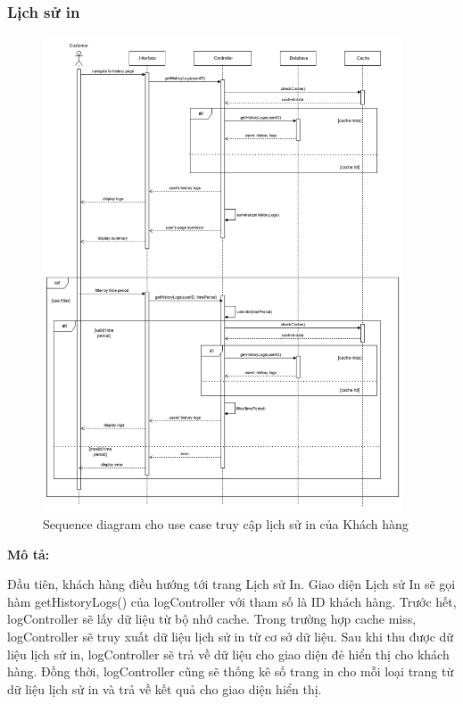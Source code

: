 \subsubsection{Lịch sử in}

\begin{figure}[H]
    \begin{center}
        \includegraphics[width=0.95\textwidth]{Images/System Modelling/Logging(customer)_Sequence.png}
        \caption{Sequence diagram cho use case truy cập lịch sử in của Khách hàng}
        \label{fig:arch}
    \end{center}
\end{figure}

\textbf{Mô tả:}\par

Đầu tiên, khách hàng điều hướng tới trang Lịch sử In. Giao diện Lịch sử In sẽ gọi hàm getHistoryLogs() của logController với tham số là ID khách hàng. Trước hết, logController sẽ lấy dữ liệu từ bộ nhớ cache. Trong trường hợp cache miss, logController sẽ truy xuất dữ liệu lịch sử in từ cơ sở dữ liệu. Sau khi thu được dữ liệu lịch sử in, logController sẽ trả về dữ liệu cho giao diện đẻ hiển thị cho khách hàng. Đồng thời, logController cũng sẽ thống kê số trang in cho mỗi loại trang từ dữ liệu lịch sử in và trả về kết quả cho giao diện hiển thị. \par

